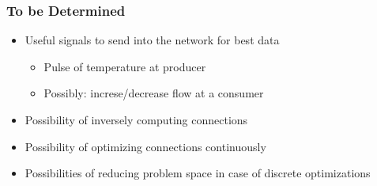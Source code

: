 \documentclass{beamer}
\begin{document}
\begin{frame}
\frametitle{To be Determined}
  \begin{itemize}
    \item Useful signals to send into the network for best data
      \begin{itemize}
        \item Pulse of temperature at producer
        \item Possibly: increse/decrease flow at a consumer
      \end{itemize}
    \item Possibility of inversely computing connections
    \item Possibility of optimizing connections continuously
    \item Possibilities of reducing problem space in case of discrete optimizations
  \end{itemize}
\end{frame}
\end{document}
